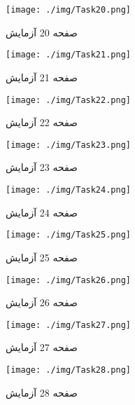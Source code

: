  
\begin{figure}[htpb]
\centering
\texttt{[image: ./img/Task20.png]}
\caption{ صفحه 20 آزمایش }
\label{fig:Task20}
\end{figure}
 
 
\begin{figure}[htpb]
\centering
\texttt{[image: ./img/Task21.png]}
\caption{ صفحه 21 آزمایش }
\label{fig:Task21}
\end{figure}
 
 
\begin{figure}[htpb]
\centering
\texttt{[image: ./img/Task22.png]}
\caption{ صفحه 22 آزمایش }
\label{fig:Task22}
\end{figure}
 
 
\begin{figure}[htpb]
\centering
\texttt{[image: ./img/Task23.png]}
\caption{ صفحه 23 آزمایش }
\label{fig:Task23}
\end{figure}
 
 
\begin{figure}[htpb]
\centering
\texttt{[image: ./img/Task24.png]}
\caption{ صفحه 24 آزمایش }
\label{fig:Task24}
\end{figure}
 
 
\begin{figure}[htpb]
\centering
\texttt{[image: ./img/Task25.png]}
\caption{ صفحه 25 آزمایش }
\label{fig:Task25}
\end{figure}
 
 
\begin{figure}[htpb]
\centering
\texttt{[image: ./img/Task26.png]}
\caption{ صفحه 26 آزمایش }
\label{fig:Task26}
\end{figure}
 
 
\begin{figure}[htpb]
\centering
\texttt{[image: ./img/Task27.png]}
\caption{ صفحه 27 آزمایش }
\label{fig:Task27}
\end{figure}
 
 
\begin{figure}[htpb]
\centering
\texttt{[image: ./img/Task28.png]}
\caption{ صفحه 28 آزمایش }
\label{fig:Task28}
\end{figure}
 
